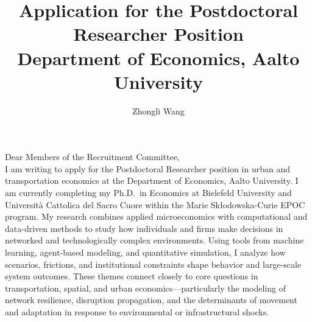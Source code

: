 \documentclass{nfr}
\title{Application for the Postdoctoral Researcher Position\\
Department of Economics, Aalto University}
\author{Zhongli Wang}
\begin{document}

% 
% 
% 
% 


\maketitle


\noindent Dear Members of the Recruitment Committee,\\[0.2cm]

I am writing to apply for the Postdoctoral Researcher position in urban and transportation economics at the Department of Economics, Aalto University. 
I am currently completing my Ph.D.\ in Economics at Bielefeld University and Università Cattolica del Sacro Cuore within the Marie Skłodowska-Curie EPOC program. 
My research combines applied microeconomics with computational and data-driven methods to study how individuals and firms make decisions in networked and technologically complex environments. 
Using tools from machine learning, agent-based modeling, and quantitative simulation, I analyze how scenarios, frictions, and institutional constraints shape behavior and large-scale system outcomes. 
These themes connect closely to core questions in transportation, spatial, and urban economics—particularly the modeling of network resilience, disruption propagation, and the determinants of movement and adaptation in response to environmental or infrastructural shocks.\\
\end{document}
